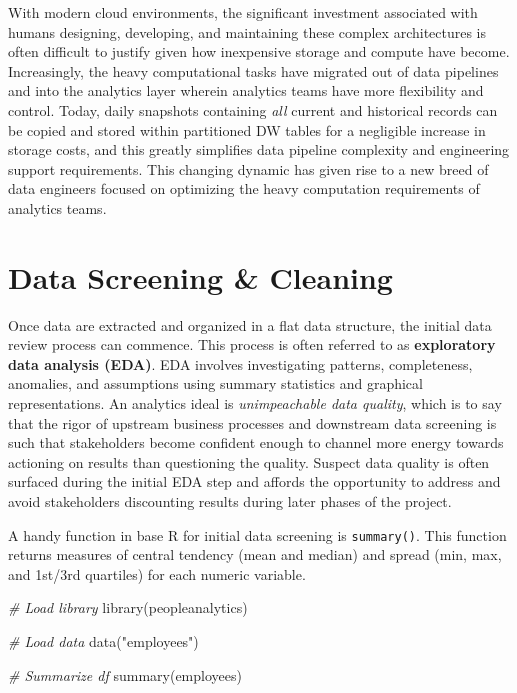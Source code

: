 \documentclass[
]{book}
\newenvironment{Shaded}{\begin{snugshade}}{\end{snugshade}}
\newcommand{\CommentTok}[1]{\textcolor[rgb]{0.56,0.35,0.01}{\textit{#1}}}
\newcommand{\FunctionTok}[1]{\textcolor[rgb]{0.00,0.00,0.00}{#1}}
\newcommand{\NormalTok}[1]{#1}
\newcommand{\StringTok}[1]{\textcolor[rgb]{0.31,0.60,0.02}{#1}}
\begin{document}
With modern cloud environments, the significant investment associated with humans designing, developing, and maintaining these complex architectures is often difficult to justify given how inexpensive storage and compute have become. Increasingly, the heavy computational tasks have migrated out of data pipelines and into the analytics layer wherein analytics teams have more flexibility and control. Today, daily snapshots containing \emph{all} current and historical records can be copied and stored within partitioned DW tables for a negligible increase in storage costs, and this greatly simplifies data pipeline complexity and engineering support requirements. This changing dynamic has given rise to a new breed of data engineers focused on optimizing the heavy computation requirements of analytics teams.

\hypertarget{data-screening-cleaning}{%
\section{Data Screening \& Cleaning}\label{data-screening-cleaning}}

Once data are extracted and organized in a flat data structure, the initial data review process can commence. This process is often referred to as \textbf{exploratory data analysis (EDA)}. EDA involves investigating patterns, completeness, anomalies, and assumptions using summary statistics and graphical representations. An analytics ideal is \emph{unimpeachable data quality}, which is to say that the rigor of upstream business processes and downstream data screening is such that stakeholders become confident enough to channel more energy towards actioning on results than questioning the quality. Suspect data quality is often surfaced during the initial EDA step and affords the opportunity to address and avoid stakeholders discounting results during later phases of the project.

A handy function in base R for initial data screening is \texttt{summary()}. This function returns measures of central tendency (mean and median) and spread (min, max, and 1st/3rd quartiles) for each numeric variable.

\begin{Shaded}
\begin{Highlighting}[]
\CommentTok{\# Load library}
\FunctionTok{library}\NormalTok{(peopleanalytics)}

\CommentTok{\# Load data}
\FunctionTok{data}\NormalTok{(}\StringTok{"employees"}\NormalTok{)}

\CommentTok{\# Summarize df}
\FunctionTok{summary}\NormalTok{(employees)}
\end{Highlighting}
\end{Shaded}
\end{document}
